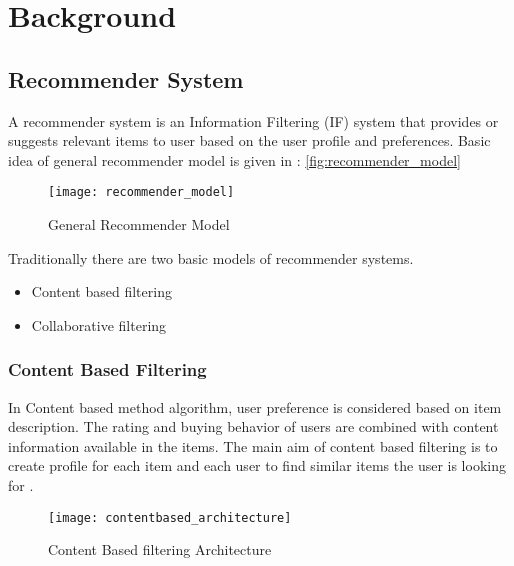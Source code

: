 \chapter{Background}
\section{Recommender System}
A recommender system is an Information Filtering (IF) system that provides or suggests relevant items to user based on the user profile and preferences. Basic idea of general recommender model is given in : \autoref{fig:recommender_model} \\

\begin{figure}[H]
	\centering
	\texttt{[image: recommender\_model]}
	\caption{General Recommender Model \cite{Khusro2016}}
	\label{fig:recommender_model}
\end{figure}

\noindent Traditionally there are two basic models of recommender systems. \begin{itemize} \item Content based filtering \item Collaborative filtering \end{itemize}


\pagebreak

\subsection{Content Based Filtering}
In Content based method algorithm, user preference is considered based on item description. The rating and buying behavior of users are combined with content information available in the items. The main aim of content based filtering is to create profile for each item and each user to find similar items the user is looking for \cite{contentbased}.
\\

\begin{figure}[H]
	\centering
	\texttt{[image: contentbased\_architecture]}
	\caption{Content Based filtering Architecture \cite{figures}}
	\label{fig:contentbased_architecture}
\end{figure}

